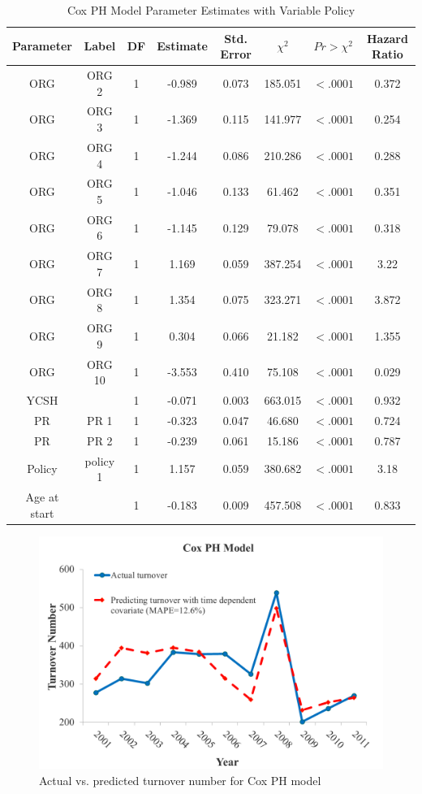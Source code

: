 \begin{table}[htbp]
	\small
	\centering
	\caption{Cox PH Model Parameter Estimates with Variable Policy}
	\begin{tabular}{cccccccc}
		\hline
		Parameter & Label & DF    &  Estimate & Std. Error & $\chi^2$    & $ Pr>\chi^2$ & Hazard Ratio \\
		\hline
		ORG   & ORG 2 & 1     & -0.989 & 0.073 & 185.051 & $<.0001$ & 0.372 \\
		ORG   & ORG 3 & 1     & -1.369 & 0.115 & 141.977 & $<.0001$ & 0.254 \\
		ORG   & ORG 4 & 1     & -1.244 & 0.086 & 210.286 & $<.0001$ & 0.288 \\
		ORG   & ORG 5 & 1     & -1.046 & 0.133 & 61.462 & $<.0001$ & 0.351 \\
		ORG   & ORG 6 & 1     & -1.145 & 0.129 & 79.078 & $<.0001$ & 0.318 \\
		ORG   & ORG 7 & 1     & 1.169 & 0.059 & 387.254 & $<.0001$ & 3.22 \\
		ORG   & ORG 8 & 1     & 1.354 & 0.075 & 323.271 & $<.0001$ & 3.872 \\
		ORG   & ORG 9 & 1     & 0.304 & 0.066 & 21.182 & $<.0001$ & 1.355 \\
		ORG   & ORG 10 & 1     & -3.553 & 0.410 & 75.108 & $<.0001$ & 0.029 \\
		YCSH  &       & 1     & -0.071 & 0.003 & 663.015 &$<.0001$ & 0.932 \\
		PR    & PR 1  & 1     & -0.323 & 0.047 & 46.680 & $<.0001$ & 0.724 \\
		PR    & PR 2  & 1     & -0.239 & 0.061 & 15.186 & $<.0001$ & 0.787 \\
		Policy & policy 1 & 1     & 1.157 & 0.059 & 380.682 & $<.0001$ & 3.18 \\
		Age at start &       & 1     & -0.183 & 0.009 & 457.508 & $<.0001$ & 0.833 \\
		\hline
	\end{tabular}%
	\label{tab:para2}%
\end{table}%
\begin{figure}[htbp]
	\centering
	\includegraphics[width=5.5in]{Fig9.png}
	\caption{Actual vs. predicted turnover number for Cox PH model}
	\label{fig:9}
\end{figure}



